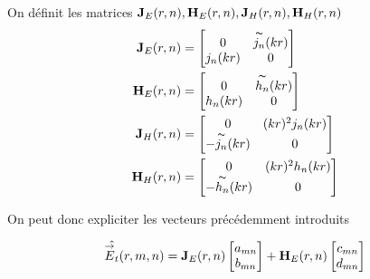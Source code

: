         \begin{defn}
            On définit les matrices \(\mathbf{J}_{E}(r,n),\mathbf{H}_{E}(r,n),\mathbf{J}_{H}(r,n),\mathbf{H}_{H}(r,n)\)
            \begin{align}
                \mathbf{J}_{E}(r,n) &=
                \begin{bmatrix}
                    0 & \overset{\thicksim}{j_n}(kr)
                    \\
                    j_n(kr) & 0
                \end{bmatrix}
                \\
                \mathbf{H}_{E}(r,n) &=
                \begin{bmatrix}
                    0 & \overset{\thicksim}{h_n}(kr)
                    \\
                    h_n(kr) & 0
                \end{bmatrix}
                \\
                \mathbf{J}_{H}(r,n) &=
                \begin{bmatrix}
                    0 & (kr)^2 j_n(kr)
                    \\
                    -\overset{\thicksim}{j_n}(kr) & 0
                \end{bmatrix}
                \\
                \mathbf{H}_{H}(r,n) &=
                \begin{bmatrix}
                    0 & (kr)^2 h_n(kr)
                    \\
                    -\overset{\thicksim}{h_n}(kr) & 0
                \end{bmatrix}
            \end{align}
        \end{defn}

        On peut donc expliciter les vecteurs précédemment introduits

        \begin{equation}
            \hat{{\overset{\rightarrow}{E}}_t}(r,m,n) = 
            \mathbf{J}_{E}(r,n)
            \begin{bmatrix}
                a_{mn}
                \\
                b_{mn}
            \end{bmatrix}
            + 
            \mathbf{H}_{E}(r,n)
            \begin{bmatrix}
                c_{mn}
                \\
                d_{mn}
            \end{bmatrix}
        \end{equation}

